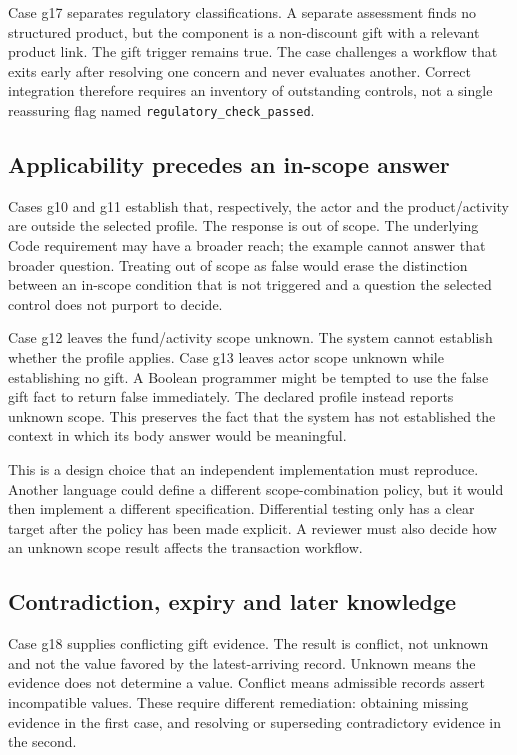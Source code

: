 \documentclass[12pt,a4paper,oneside,openany]{book}
\begin{document}
Case g17 separates regulatory classifications. A separate assessment finds no
structured product, but the component is a non-discount gift with a relevant
product link. The gift trigger remains true. The case challenges a workflow
that exits early after resolving one concern and never evaluates another.
Correct integration therefore requires an inventory of outstanding controls,
not a single reassuring flag named \texttt{regulatory\_check\_passed}.

\subsection{Applicability precedes an in-scope answer}
Cases g10 and g11 establish that, respectively, the actor and the product/activity
are outside the selected profile. The response is out of scope. The underlying
Code requirement may have a broader reach; the example cannot answer that
broader question. Treating out of scope as false would erase the distinction
between an in-scope condition that is not triggered and a question the selected
control does not purport to decide.

Case g12 leaves the fund/activity scope unknown. The system cannot establish
whether the profile applies. Case g13 leaves actor scope unknown while
establishing no gift. A Boolean programmer might be tempted to use the false
gift fact to return false immediately. The declared profile instead reports
unknown scope. This preserves the fact that the system has not established the
context in which its body answer would be meaningful.

This is a design choice that an independent implementation must reproduce.
Another language could define a different scope-combination policy, but it
would then implement a different specification. Differential testing only has
a clear target after the policy has been made explicit. A reviewer must also
decide how an unknown scope result affects the transaction workflow.

\subsection{Contradiction, expiry and later knowledge}
Case g18 supplies conflicting gift evidence. The result is conflict, not
unknown and not the value favored by the latest-arriving record. Unknown means
the evidence does not determine a value. Conflict means admissible records
assert incompatible values. These require different remediation: obtaining
missing evidence in the first case, and resolving or superseding contradictory
evidence in the second.
\end{document}

